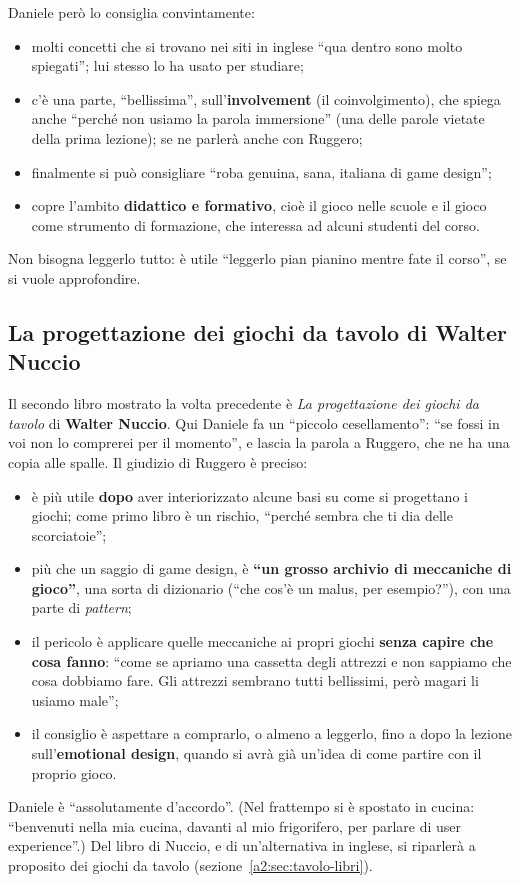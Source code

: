 Daniele però lo consiglia convintamente:
\begin{itemize}
  \item molti concetti che si trovano nei siti in inglese ``qua dentro sono
        molto spiegati''; lui stesso lo ha usato per studiare;
  \item c'è una parte, ``bellissima'', sull'\textbf{involvement} (il
        coinvolgimento), che spiega anche ``perché non usiamo la parola
        immersione'' (una delle parole vietate della prima lezione); se ne
        parlerà anche con Ruggero;
  \item finalmente si può consigliare ``roba genuina, sana, italiana di game
        design'';
  \item copre l'ambito \textbf{didattico e formativo}, cioè il gioco nelle
        scuole e il gioco come strumento di formazione, che interessa ad alcuni
        studenti del corso.
\end{itemize}
Non bisogna leggerlo tutto: è utile ``leggerlo pian pianino mentre fate il
corso'', se si vuole approfondire.

\subsection{La progettazione dei giochi da tavolo di Walter Nuccio}

Il secondo libro mostrato la volta precedente è \emph{La progettazione dei
giochi da tavolo} di \textbf{Walter Nuccio}. Qui Daniele fa un ``piccolo
cesellamento'': ``se fossi in voi non lo comprerei per il momento'', e lascia la
parola a Ruggero, che ne ha una copia alle spalle. Il giudizio di Ruggero è
preciso:
\begin{itemize}
  \item è più utile \textbf{dopo} aver interiorizzato alcune basi su come si
        progettano i giochi; come primo libro è un rischio, ``perché sembra che
        ti dia delle scorciatoie'';
  \item più che un saggio di game design, è \textbf{``un grosso archivio di
        meccaniche di gioco''}, una sorta di dizionario (``che cos'è un malus,
        per esempio?''), con una parte di \emph{pattern};
  \item il pericolo è applicare quelle meccaniche ai propri giochi
        \textbf{senza capire che cosa fanno}: ``come se apriamo una cassetta
        degli attrezzi e non sappiamo che cosa dobbiamo fare. Gli attrezzi
        sembrano tutti bellissimi, però magari li usiamo male'';
  \item il consiglio è aspettare a comprarlo, o almeno a leggerlo, fino a dopo
        la lezione sull'\textbf{emotional design}, quando si avrà già un'idea di
        come partire con il proprio gioco.
\end{itemize}
Daniele è ``assolutamente d'accordo''. (Nel frattempo si è spostato in cucina:
``benvenuti nella mia cucina, davanti al mio frigorifero, per parlare di user
experience''.) Del libro di Nuccio, e di un'alternativa in inglese, si
riparlerà a proposito dei giochi da tavolo (sezione~\ref{a2:sec:tavolo-libri}).

